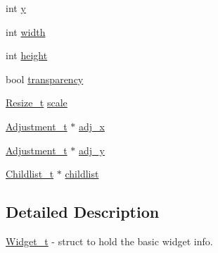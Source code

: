 \begin{DoxyCompactItemize}
int \hyperlink{structWidget__t_acb9402de44e47837e1821b93fc052b38}{y}
\item 
int \hyperlink{structWidget__t_a3204c88196ed5793250b3530dd719037}{width}
\item 
int \hyperlink{structWidget__t_a1def6d2237743e75a0b84ca0c34a6834}{height}
\item 
bool \hyperlink{structWidget__t_a42a597c21eca964c0296fc7026feb43b}{transparency}
\item 
\hyperlink{structResize__t}{Resize\+\_\+t} \hyperlink{structWidget__t_a9a2d5b53f40f5bf3914fc0694027d7ec}{scale}
\item 
\hyperlink{structAdjustment__t}{Adjustment\+\_\+t} $\ast$ \hyperlink{structWidget__t_aabc05e0a46c85d24483fae36127b45dd}{adj\+\_\+x}
\item 
\hyperlink{structAdjustment__t}{Adjustment\+\_\+t} $\ast$ \hyperlink{structWidget__t_abde95d3fb49faff5dd852f16810115e7}{adj\+\_\+y}
\item 
\hyperlink{structChildlist__t}{Childlist\+\_\+t} $\ast$ \hyperlink{structWidget__t_ac203ccbc58958a7c205897d4aba197e9}{childlist}
\end{DoxyCompactItemize}


\subsection{Detailed Description}
\hyperlink{structWidget__t}{Widget\+\_\+t} -\/ struct to hold the basic widget info. 


